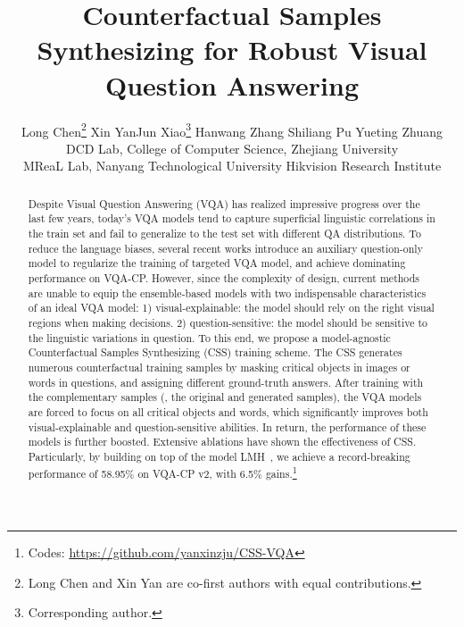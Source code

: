 \documentclass[10pt,twocolumn,letterpaper]{article}
\begin{document}
\title{Counterfactual Samples Synthesizing for Robust Visual Question Answering}

\author{Long Chen\thanks{Long Chen and Xin Yan are co-first authors with equal contributions.} \quad Xin Yan\footnotemark[1] \quad Jun Xiao\thanks{Corresponding author.} \quad Hanwang Zhang \quad Shiliang Pu \quad Yueting Zhuang \\
DCD Lab, College of Computer Science, Zhejiang University \\ MReaL Lab, Nanyang Technological University \qquad Hikvision Research Institute \\
}

\maketitle
\thispagestyle{empty}

\begin{abstract}
	Despite Visual Question Answering (VQA) has realized impressive progress over the last few years, today's VQA models tend to capture superficial linguistic correlations in the train set and fail to generalize to the test set with different QA distributions. To reduce the language biases, several recent works introduce an auxiliary question-only model to regularize the training of targeted VQA model, and achieve dominating performance on VQA-CP. However, since the complexity of design, current methods are unable to equip the ensemble-based models with two indispensable characteristics of an ideal VQA model: 1) visual-explainable: the model should rely on the right visual regions when making decisions. 2) question-sensitive: the model should be sensitive to the linguistic variations in question. To this end, we propose a model-agnostic Counterfactual Samples Synthesizing (CSS) training scheme. The CSS generates numerous counterfactual training samples by masking critical objects in images or words in questions, and assigning different ground-truth answers. After training with the complementary samples (\ie, the original and generated samples), the VQA models are forced to focus on all critical objects and words, which significantly improves both visual-explainable and question-sensitive abilities. In return, the performance of these models is further boosted. Extensive ablations have shown the effectiveness of CSS. Particularly, by building on top of the model LMH~\cite{clark2019don}, we achieve a record-breaking performance of 58.95\% on VQA-CP v2, with 6.5\% gains.\footnote{Codes: \href{https://github.com/yanxinzju/CSS-VQA}{https://github.com/yanxinzju/CSS-VQA}}
\end{abstract}
\vspace{-0.5em}
\end{document}
